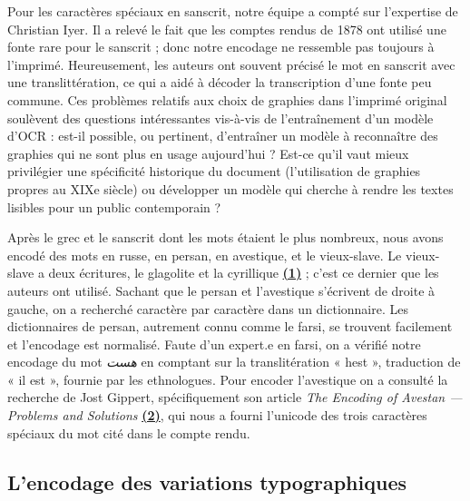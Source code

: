 \documentclass{article}
\begin{document}
	Pour les caractères spéciaux en sanscrit, notre équipe a compté sur l’expertise de Christian Iyer. Il a relevé le fait que les comptes rendus de 1878 ont utilisé une fonte rare pour le sanscrit ; donc notre encodage ne ressemble pas toujours à l’imprimé. Heureusement, les auteurs ont souvent précisé le mot en sanscrit avec une translittération, ce qui a aidé à décoder la transcription d’une fonte peu commune. Ces problèmes relatifs aux choix de graphies dans l'imprimé original soulèvent des questions intéressantes vis-à-vis de l'entraînement d'un modèle d'OCR : est-il possible, ou pertinent, d'entraîner un modèle à reconnaître des graphies qui ne sont plus en usage aujourd'hui ? Est-ce qu'il vaut mieux privilégier une spécificité historique du document (l'utilisation de graphies propres au XIXe siècle) ou développer un modèle qui cherche à rendre les textes lisibles pour un public contemporain ?
	
	Après le grec et le sanscrit dont les mots étaient le plus nombreux, nous avons encodé des mots en russe, en persan, en avestique, et le vieux-slave. Le vieux-slave a deux écritures, le glagolite et la cyrillique \underline{\textbf{(1)}} ; c'est ce dernier que les auteurs ont utilisé. Sachant que le persan et l’avestique s’écrivent de droite à gauche, on a recherché caractère par caractère dans un dictionnaire. Les dictionnaires de persan, autrement connu comme le farsi, se trouvent facilement et l’encodage est normalisé. Faute d’un expert.e en farsi, on a vérifié notre encodage du mot \textit{ هست } en comptant sur la translitération « hest », traduction de « il est », fournie par les ethnologues. Pour encoder l’avestique on a consulté la recherche de Jost Gippert, spécifiquement son article \textit{The Encoding of Avestan — Problems and Solutions} \underline{\textbf{(2)}}, qui nous a fourni l’unicode des trois caractères spéciaux du mot cité dans le compte rendu.
	
	
	\subsection{L'encodage des variations typographiques}
	
\end{document}
